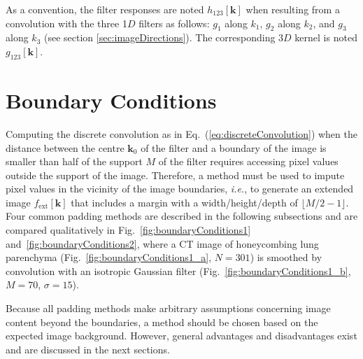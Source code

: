 \documentclass[fleqn,a4paper,oneside,openany]{book}
\begin{document}
As a convention, the filter responses are noted $h_{123}[\boldsymbol{k}]$ when resulting from a convolution with the three 1$D$ filters as follows: $g_1$ along $k_1$, $g_2$ along $k_2$, and $g_3$ along $k_3$ (see section \ref{sec:imageDirections}).
The corresponding 3$D$ kernel is noted $g_{123}[\boldsymbol{k}]$.


\section{Boundary Conditions}\label{sec:boundaryConditions}
%
Computing the discrete convolution as in Eq.~(\ref{eq:discreteConvolution}) when the distance between the centre $\boldsymbol{k}_0$ of the filter and a boundary of the image is smaller than half of the support $M$ of the filter requires accessing pixel values outside the support of the image.
Therefore, a method must be used to impute pixel values in the vicinity of the image boundaries, \emph{i.e.}, to generate an extended image $f_{\text{ext}}[\boldsymbol{k}]$ that includes a margin with a width/height/depth of $\lfloor M/2-1 \rfloor$.
Four common padding methods are described in the following subsections and are compared qualitatively in Fig.~\ref{fig:boundaryConditions1} and~\ref{fig:boundaryConditions2}, where a CT image of honeycombing lung parenchyma (Fig.~\ref{fig:boundaryConditions1_a}, $N=301$) is smoothed by convolution with an isotropic Gaussian filter (Fig.~\ref{fig:boundaryConditions1_b}, $M=70$, $\sigma = 15$).

Because all padding methods make arbitrary assumptions concerning image content beyond the boundaries, a method should be chosen based on the expected image background.
However, general advantages and disadvantages exist and are discussed in the next sections.
\end{document}
